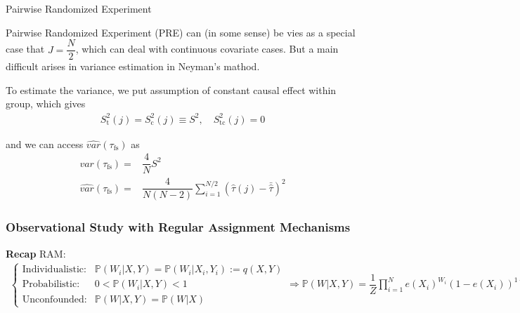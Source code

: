 \begin{point}
    Pairwise Randomized Experiment
\end{point}

Pairwise Randomized Experiment (PRE) can (in some sense) be vies as a special case that $ J=\dfrac{N}{2} $, which can deal with continuous covariate cases. But a main difficult arises in variance estimation in Neyman's mathod. 

To estimate the variance, we put assumption of constant causal effect within group, which gives
\begin{align}
     S^2_\mathrm{t}(j)=S^2_\mathrm{c}(j)\equiv S^2,\quad S^2_\mathrm{tc}(j)=0 
\end{align}

and we can access $ \hat{var}(\tau_\mathrm{fs} ) $ as
\begin{align}
    var(\tau_\mathrm{fs} )=&\dfrac{4}{N}S^2\\
    \hat{var}(\tau_\mathrm{fs} )=&\dfrac{4}{N(N-2)}\sum_{i=1}^{N/2}\left(\hat{\tau}(j)-\bar{\hat{\tau}}\right)^2
\end{align}

\subsubsection{Observational Study with Regular Assignment Mechanisms}
\textbf{Recap} RAM:
\begin{align*}
    \begin{cases}
        \text{Individualistic:}&\mathbb{P}\left( W_i|X,Y \right)= \mathbb{P}\left( W_i|X_i,Y_i \right) := q(X,Y)\\
        \text{Probabilistic:}&0<\mathbb{P}\left( W_i|X,Y \right)<1\\
        \text{Unconfounded:}&\mathbb{P}\left( W|X,Y \right)=\mathbb{P}\left( W|X \right)  
    \end{cases} \Rightarrow \mathbb{P}\left( W|X,Y \right)=\dfrac{1}{Z}\prod_{i=1}^N e(X_i)^{W_i}(1-e(X_i))^{1-W_i} 
\end{align*}

    
